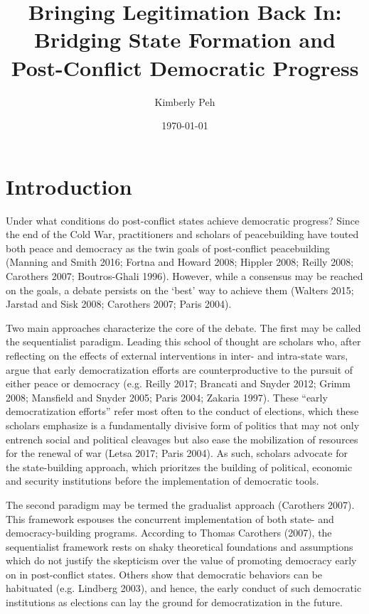 \documentclass [11pt]{article}
\title{Bringing Legitimation Back In: Bridging State Formation and Post-Conflict Democratic Progress}
\author{Kimberly Peh}
\date{\today}
\begin{document}
\maketitle

\section*{Introduction} 

Under what conditions do post-conflict states achieve democratic progress? Since the end of the Cold War, practitioners and scholars of peacebuilding have touted both peace and democracy as the twin goals of post-conflict peacebuilding (Manning and Smith 2016; Fortna and Howard 2008; Hippler 2008; Reilly 2008; Carothers 2007; Boutros-Ghali 1996). However, while a consensus may be reached on the goals, a debate persists on the `best' way to achieve them (Walters 2015; Jarstad and Sisk 2008; Carothers 2007; Paris 2004).

Two main approaches characterize the core of the debate. The first may be called the sequentialist paradigm. Leading this school of thought are scholars who, after reflecting on the effects of external interventions in inter- and intra-state wars, argue that early democratization efforts are counterproductive to the pursuit of either peace or democracy (e.g. Reilly 2017; Brancati and Snyder 2012; Grimm 2008; Mansfield and Snyder 2005; Paris 2004; Zakaria 1997). These ``early democratization efforts'' refer most often to the conduct of elections, which these scholars emphasize is a fundamentally divisive form of politics that may not only entrench social and political cleavages but also ease the mobilization of resources for the renewal of war (Letsa 2017; Paris 2004). As such, scholars advocate for the state-building approach, which prioritzes the building of political, economic and security institutions before the implementation of democratic tools. %

The second paradigm may be termed the gradualist approach (Carothers 2007). This framework espouses the concurrent implementation of both state- and democracy-building programs. According to Thomas Carothers (2007), the sequentialist framework rests on shaky theoretical foundations and assumptions which do not justify the skepticism over the value of promoting democracy early on in post-conflict states. Others show that democratic behaviors can be habituated (e.g. Lindberg 2003), and hence, the early conduct of such democratic institutions as elections can lay the ground for democratization in the future.
\end{document}
